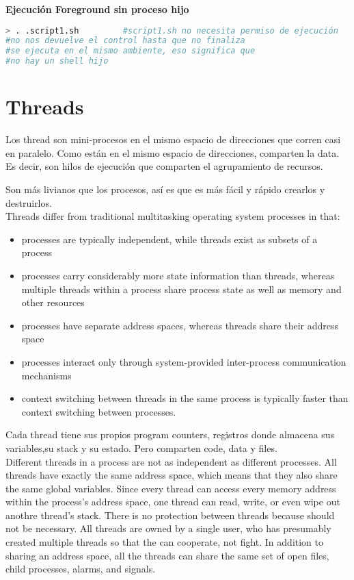 \documentclass[a4paper, twoside]{article}
\begin{document}
\textbf{Ejecución Foreground sin proceso hijo}
\begin{lstlisting}[language=sh]
> . .script1.sh 		#script1.sh no necesita permiso de ejecución
#no nos devuelve el control hasta que no finaliza
#se ejecuta en el mismo ambiente, eso significa que
#no hay un shell hijo
\end{lstlisting}

\newpage
\section{Threads}

Los thread son mini-procesos en el mismo espacio de direcciones que corren
casi en paralelo.
Como están en el mismo espacio de direcciones, comparten la data.
Es decir, son hilos de ejecución que comparten el agrupamiento de recursos.

Son más livianos que los procesos, así es que es más fácil y rápido crearlos y
destruirlos.\\

Threads differ from traditional multitasking operating system processes in that:
\begin{itemize}
  \item processes are typically independent, while threads exist as subsets
  of a process
  \item processes carry considerably more state information than threads,
  whereas multiple threads within a process share process state as well as
  memory and other resources
  \item processes have separate address spaces, whereas threads share their
  address space
  \item processes interact only through system-provided inter-process
  communication mechanisms
  \item context switching between threads in the same process is typically
  faster than context switching between processes.
\end{itemize}

Cada thread tiene sus propios program counters, registros donde almacena sus
variables,su stack y su estado.
Pero comparten code, data y files.\\

Different threads in a process are not as independent as different processes.
All threads have exactly the same address space, which means that they also
share the same global variables.
Since every thread can access every memory address within the process's address
space, one thread can read, write, or even wipe out anothre thread's stack.
There is no protection between threads because should not be necessary.
All threads are owned by a single user, who has presumably created multiple
threads so that the can cooperate, not fight.
In addition to sharing an address space, all the threads can share the same
set of open files, child processes, alarms, and signals.
\end{document}
